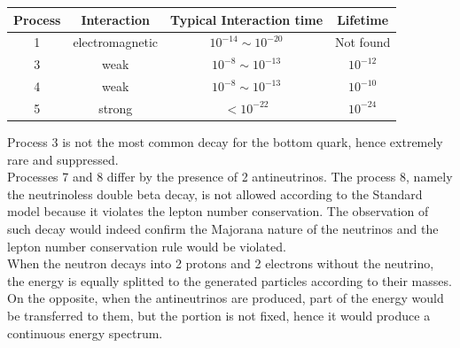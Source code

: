 \begin{table}[hbtp]
    \centering 
    \begin{tabular}{cccc}
        \toprule
            Process & Interaction & Typical Interaction time & Lifetime \\
        \midrule
            1 & electromagnetic & $10^{-14} \sim 10^{-20}$ & Not found\\
            3 & weak & $10^{-8} \sim 10^{-13}$ & $10^{-12}$ \\
            4 & weak & $10^{-8} \sim 10^{-13}$ & $10^{-10}$ \\
            5 & strong & $<10^{-22}$ & $10^{-24}$ \\
        \bottomrule
    \end{tabular}
\end{table}

Process 3 is not the most common decay for the bottom quark, hence extremely rare and suppressed. \\
Processes 7 and 8 differ by the presence of 2 antineutrinos. The process 8, namely the neutrinoless double beta decay,
is not allowed according to the Standard model because it violates the lepton number conservation. The observation of such 
decay would indeed confirm the Majorana nature of the neutrinos and the lepton number conservation rule would be violated. \\
When the neutron decays into 2 protons and 2 electrons without the neutrino, the energy is equally splitted to the generated particles 
according to their masses. On the opposite, when the antineutrinos are produced, part of the energy would be transferred to them,
but the portion is not fixed, hence it would produce a continuous energy spectrum.

